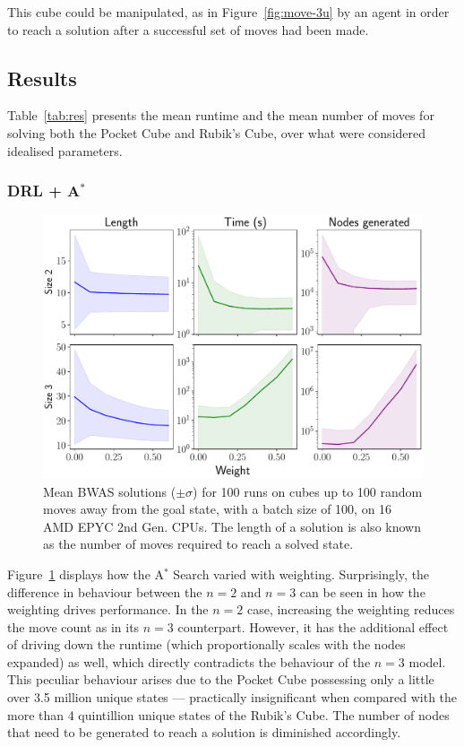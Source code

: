 \documentclass[UKenglish]{svproc}
\begin{document}
This cube could be manipulated, as in Figure~\ref{fig:move-3u} by an agent in order to reach a solution after a successful set of moves had been made.

\subsection{Results}

Table~\ref{tab:res} presents the mean runtime and the mean number of moves for solving both the Pocket Cube and Rubik's Cube, over what were considered idealised parameters.


\subsubsection{DRL + A$^{\ast}$}

\begin{figure}[!ht]
  \centering
  \includegraphics[width=0.7\linewidth]{bwas}
  \caption{Mean BWAS solutions ($\pm\sigma$) for 100 runs on cubes up to 100
    random moves away from the goal state, with a batch size of 100, on 16 AMD
    EPYC 2nd Gen. CPUs. The length of a solution is also known as the number of
    moves required to reach a solved state.}
  \label{fig:bwas}
\end{figure}

Figure~\ref{fig:bwas} displays how the A$^{\ast}$ Search varied with weighting. Surprisingly, the difference in behaviour between the $n=2$ and $n=3$ can be seen in how the weighting drives performance. In the $n=2$ case, increasing the weighting reduces the move count as in its $n=3$ counterpart. However, it has the additional effect of driving down the runtime (which proportionally scales with the nodes expanded) as well, which directly contradicts the behaviour of the $n=3$ model. This peculiar behaviour arises due to the Pocket Cube possessing only a little over 3.5 million unique states --- practically insignificant when compared with the more than 4 quintillion unique states of the Rubik's Cube. The number of nodes that need to be generated to reach a solution is diminished accordingly.
\end{document}
